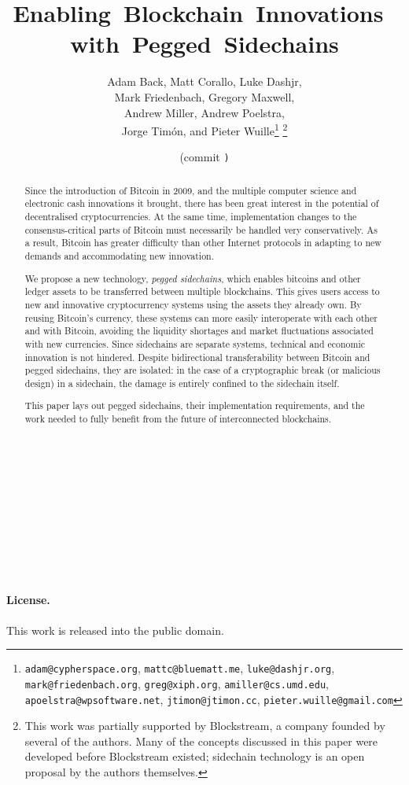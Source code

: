 \documentclass[letterpaper]{article}
\title{Enabling~Blockchain~Innovations~with~Pegged~Sidechains}
\author{
  Adam Back,
  Matt Corallo,
  Luke Dashjr,\\
  Mark Friedenbach,
  Gregory Maxwell,\\
  Andrew Miller,
  Andrew Poelstra,\\
  Jorge Tim\'on,
  and
  Pieter Wuille\footnote{
    \texttt{adam@cypherspace.org},
    \texttt{mattc@bluematt.me},
    \texttt{luke@dashjr.org},
    \texttt{mark@friedenbach.org},\newline
    \texttt{greg@xiph.org},
    \texttt{amiller@cs.umd.edu},
    \texttt{apoelstra@wpsoftware.net},
    \texttt{jtimon@jtimon.cc},\newline
    \texttt{pieter.wuille@gmail.com}}
\footnote{This work was partially supported by Blockstream, a company founded by several of the authors. Many of the concepts discussed in this paper were developed before
Blockstream existed; sidechain technology is an open proposal by the authors
themselves.}
}
\date{\gitAuthorDate{} (commit \texttt{\gitAbbrevHash)}}
\newcommand{\sidechain}{sidechain\xspace}
\newcommand{\sidechains}{sidechains\xspace}
\newcommand{\peggedsidechains}{pegged sidechains\xspace}
\begin{document}
\maketitle
{}

\begin{abstract}
Since the introduction of Bitcoin\cite{nakamoto2009} in 2009, and the multiple computer
science and electronic cash innovations it brought, there has been
great interest in the potential of decentralised cryptocurrencies. At the
same time, implementation changes to the consensus-critical parts of Bitcoin
must necessarily be handled very conservatively. As a result, Bitcoin has greater
difficulty than other Internet protocols in adapting to new demands and accommodating new innovation.

We propose a new technology, \emph{\peggedsidechains}, which enables bitcoins and
other ledger assets to be transferred between multiple blockchains. This gives
users access to new and innovative cryptocurrency systems using the assets
they already own. By reusing Bitcoin's currency, these systems can more easily
interoperate with each other and with Bitcoin, avoiding the liquidity shortages
and market fluctuations associated with new currencies. Since \sidechains
are separate systems, technical and economic innovation is not hindered. Despite
bidirectional transferability between Bitcoin and \peggedsidechains, they are
isolated: in the case of a cryptographic break (or malicious design) in a sidechain,
the damage is entirely confined to the \sidechain itself.

This paper lays out \peggedsidechains, their implementation requirements, and
the work needed to fully benefit from the future of interconnected blockchains.
\end{abstract}

\clearpage
\tableofcontents

~\\~\\~\\~\\~\\~\\~\\
\paragraph{License.} This work is released into the public domain.
\clearpage
\modulolinenumbers[10]
\linenumbers
\end{document}
